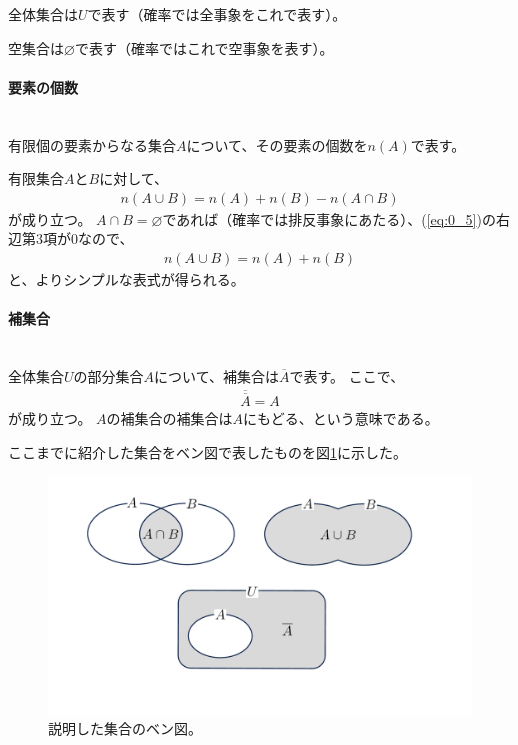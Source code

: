 \documentclass[luatexja,fontsize=12pt]{jlreq}\usepackage{ifthen}\newcounter{enlarge}\setcounter{enlarge}{1}
\begin{document}
全体集合は$U$で表す（確率では全事象をこれで表す）。

空集合は$\varnothing$で表す（確率ではこれで空事象を表す）。
\mbox{}\\

\paragraph{要素の個数}\mbox{}\\
\indent
有限個の要素からなる集合$A$について、その要素の個数を$n(A)$で表す。

有限集合$A$と$B$に対して、
\begin{align} \label{eq:0_5}
n(A \cup B)=n(A)+n(B)-n(A \cap B)
\end{align}
が成り立つ。
$A \cap B=\varnothing $であれば（確率では排反事象にあたる）、(\ref{eq:0_5})の右辺第3項が0なので、
\begin{align} \label{eq:0_6}
n(A \cup B)=n(A)+n(B)
\end{align}
と、よりシンプルな表式が得られる。
\mbox{}\\

\paragraph{補集合}\mbox{}\\
\indent
全体集合$U$の部分集合$A$について、補集合は$\overline{A}$で表す。
ここで、
\begin{align} \label{eq:0_7}
\overline{\overline{A}}=A
\end{align}
が成り立つ。
$A$の補集合の補集合は$A$にもどる、という意味である。

ここまでに紹介した集合をベン図で表したものを図\ref{f:0.1}に示した。
\begin{figure}[] 
\centering 
\includegraphics[width=10truecm]{f0_1.pdf}
\captionsetup{width=.9\linewidth}
\caption{%
説明した集合のベン図。
}
\label{f:0.1}
\end{figure}%
\end{document}
